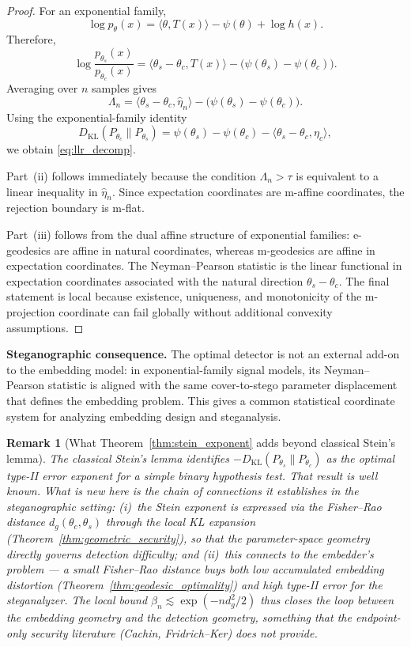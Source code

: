 \documentclass[a4paper,fleqn]{cas-dc}
\newtheorem{remark}{Remark}
\newcommand{\DKL}{D_{\mathrm{KL}}}
\begin{document}
\begin{proof}
For an exponential family,
\[
  \log p_\theta(x)
  =
  \langle\theta,T(x)\rangle-\psi(\theta)+\log h(x).
\]
Therefore,
\[
  \log\frac{p_{\theta_s}(x)}{p_{\theta_c}(x)}
  =
  \langle\theta_s-\theta_c,T(x)\rangle
  -
  \bigl(\psi(\theta_s)-\psi(\theta_c)\bigr).
\]
Averaging over $n$ samples gives
\[
  \Lambda_n
  =
  \langle\theta_s-\theta_c,\hat\eta_n\rangle
  -
  \bigl(\psi(\theta_s)-\psi(\theta_c)\bigr).
\]
Using the exponential-family identity
\[
  \DKL(P_{\theta_c}\|P_{\theta_s})
  =
  \psi(\theta_s)-\psi(\theta_c)
  -
  \langle\theta_s-\theta_c,\eta_c\rangle,
\]
we obtain \eqref{eq:llr_decomp}.

Part~(ii) follows immediately because the condition
$\Lambda_n>\tau$ is equivalent to a linear inequality in
$\hat\eta_n$.  Since expectation coordinates are m-affine coordinates,
the rejection boundary is m-flat.

Part~(iii) follows from the dual affine structure of exponential families:
e-geodesics are affine in natural coordinates, whereas m-geodesics are
affine in expectation coordinates.  The Neyman--Pearson statistic is the
linear functional in expectation coordinates associated with the natural
direction $\theta_s-\theta_c$.  The final statement is local because
existence, uniqueness, and monotonicity of the m-projection coordinate can
fail globally without additional convexity assumptions.
\end{proof}

\noindent\textbf{Steganographic consequence.}
The optimal detector is not an external add-on to the embedding model: in
exponential-family signal models, its Neyman--Pearson statistic is aligned with
the same cover-to-stego parameter displacement that defines the embedding
problem. This gives a common statistical coordinate system for analyzing
embedding design and steganalysis.

\begin{remark}[What Theorem~\ref{thm:stein_exponent} adds beyond classical Stein's lemma]
The classical Stein's lemma identifies $-D_{\mathrm{KL}}(P_{\theta_s}\|P_{\theta_c})$
as the optimal type-II error exponent for a simple binary hypothesis test.
That result is well known.
What is new here is the chain of connections it establishes in the
steganographic setting: (i)~the Stein exponent is expressed via the
Fisher--Rao distance $d_g(\theta_c,\theta_s)$ through the local KL expansion
(Theorem~\ref{thm:geometric_security}), so that the parameter-space geometry
directly governs detection difficulty; and (ii)~this connects to the embedder's
problem --- a small Fisher--Rao distance buys both low accumulated embedding
distortion (Theorem~\ref{thm:geodesic_optimality}) and high type-II error for
the steganalyzer.
The local bound $\beta_n \lesssim \exp(-nd_g^2/2)$ thus closes the loop
between the embedding geometry and the detection geometry, something that the
endpoint-only security literature (Cachin, Fridrich--Ker) does not provide.
\end{remark}
\end{document}
